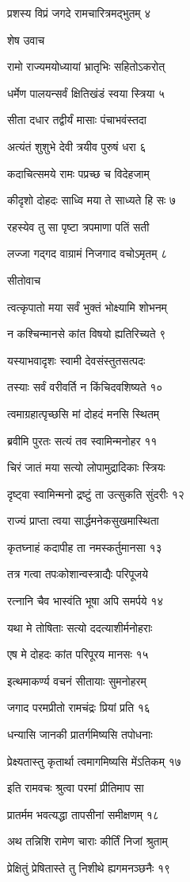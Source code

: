 प्रशस्य विप्रं जगदे रामचारित्रमद्भुतम् ४

शेष उवाच

रामो राज्यमयोध्यायां भ्रातृभिः सहितोऽकरोत्

धर्मेण पालयन्सर्वं क्षितिखंडं स्वया स्त्रिया ५

सीता दधार तद्वीर्यं मासाः पंचाभवंस्तदा

अत्यंतं शुशुभे देवी त्रयीव पुरुषं धरा ६

कदाचित्समये रामः पप्रच्छ च विदेहजाम्

कीदृशो दोहदः साध्वि मया ते साध्यते हि सः ७

रहस्येव तु सा पृष्टा त्रपमाणा पतिं सती

लज्जा गद्गद वाग्रामं निजगाद वचोऽमृतम् ८

सीतोवाच

त्वत्कृपातो मया सर्वं भुक्तं भोक्ष्यामि शोभनम्

न कश्चिन्मानसे कांत विषयो ह्यतिरिच्यते ९

यस्याभवादृशः स्वामी देवसंस्तुतसत्पदः

तस्याः सर्वं वरीवर्ति न किंचिदवशिष्यते १०

त्वमाग्रहात्पृच्छसि मां दोहदं मनसि स्थितम्

ब्रवीमि पुरतः सत्यं तव स्वामिन्मनोहर ११

चिरं जातं मया सत्यो लोपामुद्रादिकाः स्त्रियः

दृष्ट्वा स्वामिन्मनो द्रष्टुं ता उत्सुकति सुंदरीः १२

राज्यं प्राप्ता त्वया सार्द्धमनेकसुखमास्थिता

कृतघ्नाहं कदापीह ता नमस्कर्तुमानसा १३

तत्र गत्वा तपःकोशान्वस्त्राद्यैः परिपूजये

रत्नानि चैव भास्वंति भूषा अपि समर्पये १४

यथा मे तोषिताः सत्यो ददत्याशीर्मनोहराः

एष मे दोहदः कांत परिपूरय मानसः १५

इत्थमाकर्ण्य वचनं सीतायाः सुमनोहरम्

जगाद परमप्रीतो रामचंद्रः प्रियां प्रति १६

धन्यासि जानकी प्रातर्गमिष्यसि तपोधनाः

प्रेक्ष्यतास्तु कृतार्था त्वमागमिष्यसि मेंऽतिकम् १७

इति रामवचः श्रुत्वा परमां प्रीतिमाप सा

प्रातर्मम भवत्यद्धा तापसीनां समीक्षणम् १८

अथ तन्निशि रामेण चाराः कीर्तिं निजां श्रुताम्

प्रेक्षितुं प्रेषितास्ते तु निशीथे ह्यगमनञ्छनैः १९


